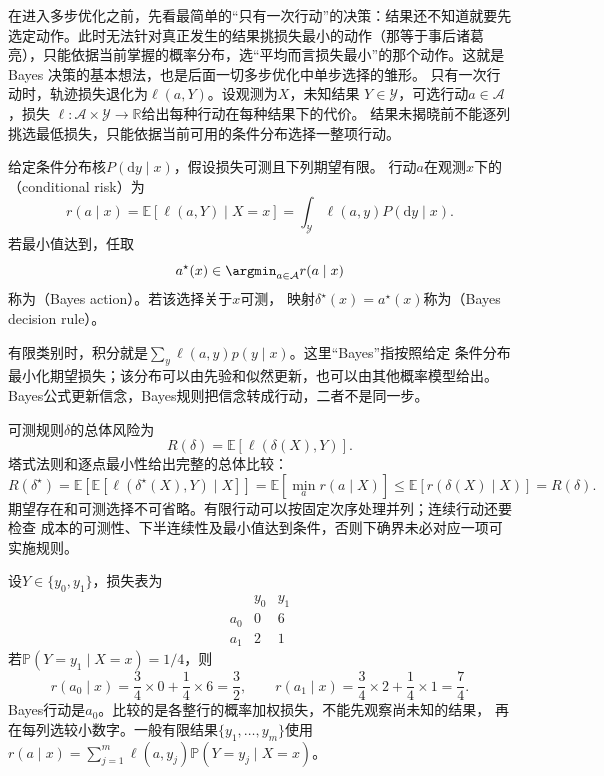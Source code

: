 在进入多步优化之前，先看最简单的“只有一次行动”的决策：结果还不知道就要先选定动作。此时无法针对真正发生的结果挑损失最小的动作（那等于事后诸葛亮），只能依据当前掌握的概率分布，选“平均而言损失最小”的那个动作。这就是 Bayes 决策的基本想法，也是后面一切多步优化中单步选择的雏形。
只有一次行动时，轨迹损失退化为$\ell(a,Y)$。设观测为$X$，未知结果
$Y\in\mathcal Y$，可选行动$a\in\mathcal A$，损失
$\ell:\mathcal A\times\mathcal Y\to\mathbb R$给出每种行动在每种结果下的代价。
结果未揭晓前不能逐列挑选最低损失，只能依据当前可用的条件分布选择一整项行动。

\begin{definition}[条件风险与Bayes决策]
\label{def:decision-conditional-risk-bayes-rule}
给定条件分布核$P(\mathrm dy\mid x)$，假设损失可测且下列期望有限。
行动$a$在观测$x$下的（conditional risk）为
\begin{equation}
  r(a\mid x)=\mathbb E[\ell(a,Y)\mid X=x]
  =\int_{\mathcal Y}\ell(a,y)P(\mathrm dy\mid x).
  \label{eq:decision-conditional-risk}
\end{equation}
若最小值达到，任取
\begin{equation}
  a^\star(x)\in\argmin_{a\in\mathcal A}r(a\mid x)
  \label{eq:decision-bayes-action}
\end{equation}
称为（Bayes action）。若该选择关于$x$可测，
映射$\delta^\star(x)=a^\star(x)$称为（Bayes decision rule）。
\end{definition}
有限类别时，积分就是$\sum_y\ell(a,y)p(y\mid x)$。这里“Bayes”指按照给定
条件分布最小化期望损失；该分布可以由先验和似然更新，也可以由其他概率模型给出。
Bayes公式更新信念，Bayes规则把信念转成行动，二者不是同一步。

可测规则$\delta$的总体风险为
\begin{equation}
  R(\delta)=\mathbb E[\ell(\delta(X),Y)].
  \label{eq:decision-rule-risk}
\end{equation}
塔式法则和逐点最小性给出完整的总体比较：
\[
  R(\delta^\star)
  =\mathbb E\!\left[\mathbb E[\ell(\delta^\star(X),Y)\mid X]\right]
  =\mathbb E[\min_a r(a\mid X)]
  \leq\mathbb E[r(\delta(X)\mid X)]
  =R(\delta).
\]
期望存在和可测选择不可省略。有限行动可以按固定次序处理并列；连续行动还要检查
成本的可测性、下半连续性及最小值达到条件，否则下确界未必对应一项可实施规则。

\begin{example}[有限损失表的逐项计算]
\label{ex:decision-finite-loss-table}
设$Y\in\{y_0,y_1\}$，损失表为
\[
  \begin{array}{c|cc}
    &y_0&y_1\\ \hline
    a_0&0&6\\
    a_1&2&1
  \end{array}
\]
若$\mathbb P(Y=y_1\mid X=x)=1/4$，则
\[
  r(a_0\mid x)=\frac34\times0+\frac14\times6=\frac32,\qquad
  r(a_1\mid x)=\frac34\times2+\frac14\times1=\frac74.
\]
Bayes行动是$a_0$。比较的是各整行的概率加权损失，不能先观察尚未知的结果，
再在每列选较小数字。一般有限结果$\{y_1,\ldots,y_m\}$使用
$r(a\mid x)=\sum_{j=1}^m\ell(a,y_j)\mathbb P(Y=y_j\mid X=x)$。
\end{example}

